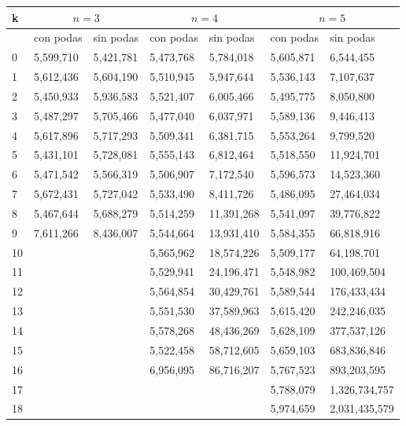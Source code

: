  \begin{table}[H]
 \parbox{0.7\textwidth}{
\begin{tabular}{ |l|l|l|l|l|l|l| }
  \hline
  k & \multicolumn{2}{|c|}{$n=3$} & \multicolumn{2}{|c|}{$n=4$} & \multicolumn{2}{|c|}{$n=5$} \\ \hline
  {}& con podas& sin podas&	con podas&	sin podas&	con podas&	sin podas \\ \hline
  0&	5,599,710&	5,421,781&	5,473,768&	5,784,018&	5,605,871&	6,544,455 \\ \hline
  1&	5,612,436&	5,604,190&	5,510,945&	5,947,644&	5,536,143&	7,107,637 \\ \hline
  2&	5,450,933&	5,936,583&	5,521,407&	6,005,466&	5,495,775&	8,050,800 \\ \hline
  3&	5,487,297&	5,705,466&	5,477,040&	6,037,971&	5,589,136&	9,446,413 \\ \hline
  4&	5,617,896&	5,717,293&	5,509,341&	6,381,715&	5,553,264&	9,799,520 \\ \hline
  5&	5,431,101&	5,728,081&	5,555,143&	6,812,464&	5,518,550&	11,924,701 \\ \hline
  6&	5,471,542&	5,566,319&	5,506,907&	7,172,540&	5,596,573&	14,523,360 \\ \hline
  7&	5,672,431&	5,727,042&	5,533,490&	8,411,726&	5,486,095&	27,464,034 \\ \hline
  8&	5,467,644&	5,688,279&	5,514,259&	11,391,268&	5,541,097&	39,776,822 \\ \hline
  9&	7,611,266&	8,436,007&	5,544,664&	13,931,410&	5,584,355&	66,818,916 \\ \hline
  10&			{}&			{}&	5,565,962&	18,574,226&	5,509,177&	64,198,701 \\ \hline
  11&			{}&			{}&	5,529,941&	24,196,471&	5,548,982&	100,469,504 \\ \hline
  12&			{}&			{}&	5,564,854&	30,429,761&	5,589,544&	176,433,434 \\ \hline
  13&			{}&			{}&	5,551,530&	37,589,963&	5,615,420&	242,246,035 \\ \hline
  14&			{}&			{}&	5,578,268&	48,436,269&	5,628,109&	377,537,126 \\ \hline
  15&			{}&			{}&	5,522,458&	58,712,605&	5,659,103&	683,836,846 \\ \hline
  16&			{}&			{}&	6,956,095&	86,716,207&	5,767,523&	893,203,595 \\ \hline
  17&			{}&			{}&			{}&			{}&	5,788,079&	1,326,734,757 \\ \hline
  18&			{}&			{}&			{}&			{}&	5,974,659&	2,031,435,579 \\ \hline

\end{tabular}}
\end{table}
